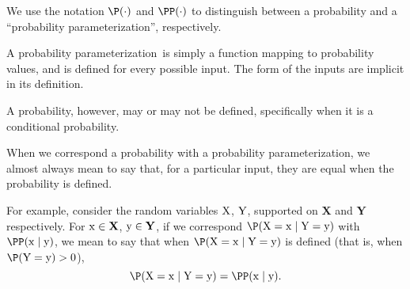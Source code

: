\begin{note}
  \def\paramprob{probability parameterization}
  We use the notation $\P(\cdot)$ and $\PP(\cdot)$ to 
  distinguish between a probability and a ``\paramprob'',
  respectively.

  A \paramprob\ is simply a function mapping 
  to probability values, and is defined for every possible input.
  The form of the inputs are implicit in its definition.

  A probability, however, may or may not be defined, specifically
  when it is a conditional probability.

  When we correspond a probability with a \paramprob,
  we almost always mean to say that, for a particular input, 
  they are equal when the probability is defined.

  \def\X{{\mathbf X}}
  \def\XV{{\rm X}}
  \def\XX{{\rm x}}

  \def\Y{{\mathbf Y}}
  \def\YV{{\rm Y}}
  \def\YY{{\rm y}}
  For example, consider the random variables $\XV$, $\YV$,
  supported on $\X$ and $\Y$ respectively. For $\XX \in \X$, $\YY \in \Y$,
  if we correspond $\P(\XV = \XX \mid \YV = \YY)$ with $\PP(\XX \mid \YY)$,
  we mean to say that when $\P(\XV = \XX \mid \YV = \YY)$ is defined (that is, when $\P(\YV = \YY) > 0$),
  $$\P(\XV = \XX \mid \YV = \YY) = \PP(\XX \mid \YY).$$%
\end{note}
